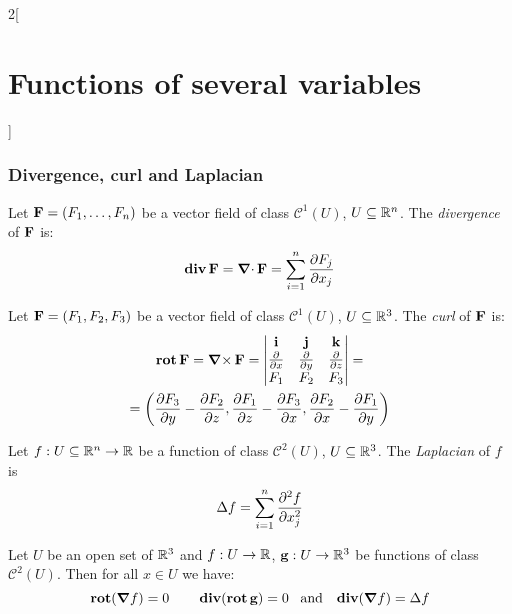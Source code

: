 \documentclass[../../../main_math.tex]{subfiles}
\begin{document}
\begin{multicols}{2}[\section{Functions of several variables}]
  \subsubsection{Divergence, curl and Laplacian}
  \begin{definition}
    Let $\boldsymbol{\mathrm{F}}=(F_1,\ldots, F_n)$ be a vector field of class $\mathcal{C}^1(U)$, $U\subseteq\mathbb{R}^n$. The \emph{divergence} of $\boldsymbol{\mathrm{F}}$ is: $$\operatorname{\boldsymbol{\mathrm{div}}}\boldsymbol{\mathrm{F}}=\operatorname{\boldsymbol{\mathrm{\nabla}}\cdot}\boldsymbol{\mathrm{F}}=\sum_{i=1}^n\frac{\partial F_j}{\partial x_j}$$
  \end{definition}
  \begin{definition}
    Let $\boldsymbol{\mathrm{F}}=(F_1,F_2,F_3)$ be a vector field of class $\mathcal{C}^1(U)$, $U\subseteq\mathbb{R}^3$. The \emph{curl} of $\boldsymbol{\mathrm{F}}$ is:
    \begin{multline*}
      \operatorname{\boldsymbol{\mathrm{rot}}}\boldsymbol{\mathrm{F}}=\operatorname{\boldsymbol{\mathrm{\nabla}}\times}\boldsymbol{\mathrm{F}}=
      \begin{vmatrix}
        \boldsymbol{\mathrm{i}}                      & \boldsymbol{\mathrm{j}}                      & \boldsymbol{\mathrm{k}}                      \\
        \frac{\partial}{\partial x} & \frac{\partial}{\partial y} & \frac{\partial}{\partial z} \\
        F_1                         & F_2                         & F_3                         \\
      \end{vmatrix}=\\=\left(\frac{\partial F_3}{\partial y}-\frac{\partial F_2}{\partial z},\frac{\partial F_1}{\partial z}-\frac{\partial F_3}{\partial x},\frac{\partial F_2}{\partial x}-\frac{\partial F_1}{\partial y}\right)
    \end{multline*}
  \end{definition}
  \begin{definition}\label{FSV:laplacian}
    Let $f:U\subseteq\mathbb{R}^n\rightarrow\mathbb{R} $ be a function of class $\mathcal{C}^2(U)$, $U\subseteq\mathbb{R}^3$. The \emph{Laplacian} of $f$ is $$\Delta f=\sum_{i=1}^n\frac{\partial^2 f}{\partial x_j^2}$$
  \end{definition}
  \begin{proposition}
    Let $U$ be an open set of $\mathbb{R}^3$ and $f:U\rightarrow\mathbb{R} $, $\boldsymbol{\mathrm{g}}:U\rightarrow\mathbb{R}^3$ be functions of class $\mathcal{C}^2(U)$. Then for all $x\in U$ we have: $$\operatorname{\boldsymbol{\mathrm{rot}}}(\grad f)=0\qquad\operatorname{\boldsymbol{\mathrm{div}}}(\operatorname{\boldsymbol{\mathrm{rot}}}\boldsymbol{\mathrm{g}})=0\;\;\;\text{and}\;\;\;\operatorname{\boldsymbol{\mathrm{div}}}(\grad f)=\Delta f$$
  \end{proposition}

\end{multicols}
\end{document}
